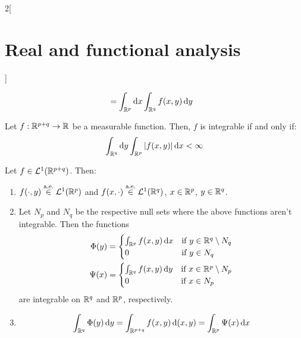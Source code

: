 \documentclass[../../../main_math.tex]{subfiles}
\begin{document}
\begin{multicols}{2}[\section{Real and functional analysis}]
\begin{corollary}
\begin{align*}
                                         & =\int_{\mathbb{R}^p}\dd{x}\int_{\mathbb{R}^q}f(x,y)\dd{y}
    \end{align*}
  \end{corollary}
  \begin{corollary}
    Let $f:\mathbb{R}^{p+q}\rightarrow\mathbb{R}$ be a measurable function. Then, $f$ is integrable if and only if: $$\int_{\mathbb{R}^q}\dd{y}\int_{\mathbb{R}^p}\abs{f(x,y)}\dd{x}<\infty$$
  \end{corollary}
  \begin{important}
    \begin{theorem}\label{RFA:fubini}
      Let $f\in \mathcal{L}^1(\mathbb{R}^{p+q})$. Then:
      \begin{enumerate}
        \item $f(\cdot,y)\overset{\text{a.e.}}{\in} \mathcal{L}^1(\mathbb{R}^p)$ and $f(x,\cdot)\overset{\text{a.e.}}{\in}\mathcal{L}^1(\mathbb{R}^q)$, $x\in\mathbb{R}^p$, $y\in\mathbb{R}^q$.
        \item Let $N_p$ and $N_q$ be the respective null sets where the above functions aren't integrable. Then the functions
              \begin{align*}
                \Phi(y) & =\begin{cases}
                             \int_{\mathbb{R}^p}f(x,y)\dd{x} & \text{if } y\in\mathbb{R}^q\setminus N_q \\
                             0                        & \text{if } y\in N_q
                           \end{cases} \\ \Psi(x)&=\begin{cases}
                  \int_{\mathbb{R}^q}f(x,y)\dd{y} & \text{if } x\in\mathbb{R}^p\setminus N_p \\
                  0                        & \text{if } x\in N_p
                \end{cases}
              \end{align*}
              are integrable on $\mathbb{R}^q$ and $\mathbb{R}^p$, respectively.
        \item \hfill $$\int_{\mathbb{R}^q}\Phi(y)\dd{y}=\int_{\mathbb{R}^{p+q}}f(x,y)\dd{(x,y)}=\int_{\mathbb{R}^p}\Psi(x)\dd{x}$$
      \end{enumerate}
    \end{theorem}
  \end{important}

\end{multicols}
\end{document}
